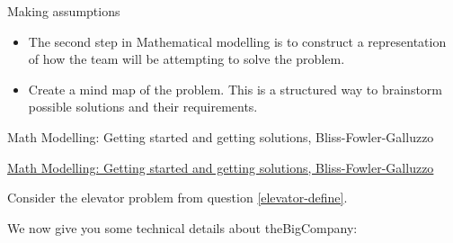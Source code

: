 	









\newpage


%
%



\begin{module}{Making assumptions}
	\label{assumption}

	
	
\end{module}



\begin{lesson}

	\begin{itemize}
		\item The second step in Mathematical modelling is to construct a representation of how the team will be attempting to solve the problem.
		\item Create a mind map of the problem. This is a structured way to brainstorm possible solutions and their requirements.
	\end{itemize}
	

\begin{annotation}
	\begin{goals}
	Math Modelling: Getting started and getting solutions, Bliss-Fowler-Galluzzo
	
	\hfill {}	
	\end{goals}
\end{annotation}
	 \href{https://m3challenge.siam.org/resources/modeling-handbook}{Math Modelling: Getting started and getting solutions, Bliss-Fowler-Galluzzo}

\end{lesson}




\newpage

\question
\label{elevator-assumptions}
Consider the elevator problem from question \ref{elevator-define}. 

We now give you some technical details about theBigCompany:


